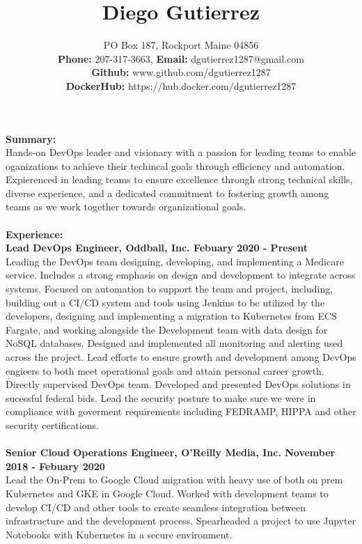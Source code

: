 \documentclass[10pt]{article}
\title{Diego Gutierrez}
\date{}
\author{%
	PO Box 187, Rockport Maine 04856\\
	\textbf{Phone:} 207-317-3663, \textbf{Email:} dgutierrez1287@gmail.com\\
	\textbf{Github:} www.github.com/dgutierrez1287\\
	\textbf{DockerHub:} https://hub.docker.com/dgutierrez1287
}
\makeatletter
\renewcommand{\maketitle}{\bgroup\setlength{\parindent}{0pt}
	\begin{flushleft}
		\LARGE\textbf{\@title}
		
		\normalsize\@author
	\end{flushleft}\egroup
}
\makeatother
\begin{document}
\maketitle
\thispagestyle{empty} %
\noindent\Large\textbf{Summary:}\\
\normalsize Hands-on DevOps leader and visionary with a passion for leading teams to enable oganizations to achieve their techincal 
goals through efficiency and automation. Expierenced in leading teams to ensure excellence through strong technical skills, 
diverse experience, and a dedicated commitment to fostering growth among teams as we work together towards organizational goals.
\\
\\
\noindent\Large\textbf{Experience:}\\
\normalsize
\textbf{Lead DevOps Engineer, Oddball, Inc. \hfill{Febuary 2020 - Present}}\\
\normalsize Leading the DevOps team designing, developing, and implementing a Medicare service. Includes a 
strong emphasis on design and development to integrate across systems. Focused on automation to support the team and project,
including, building out a CI/CD system and tools using Jenkins to be utilized by the developers, designing and implementing a migration to Kubernetes from ECS Fargate, and working 
alongside the Development team with data design for NoSQL databases. Designed and implemented all monitoring and alerting used across the project. Lead efforts to ensure growth 
and development among DevOps engieers to both meet operational goals and attain personal career growth. Directly supervised DevOps team. Developed and presented DevOps solutions
in sucessful federal bids. Lead the security posture to make sure we were in compliance with goverment requirements including FEDRAMP, HIPPA and other security certifications.
\\
\\
\normalsize
\textbf{Senior Cloud Operations Engineer, O'Reilly Media, Inc. \hfill{November 2018 - Febuary 2020}}\\
\normalsize Lead the On-Prem to Google Cloud migration with heavy use of both on prem Kubernetes and GKE in Google Cloud. Worked with 
development teams to develop CI/CD and other tools to create seamless integration between infrastructure and the development process. Spearheaded 
a project to use Jupyter Notebooks with Kubernetes in a secure environment.
\\
\\
\end{document}
